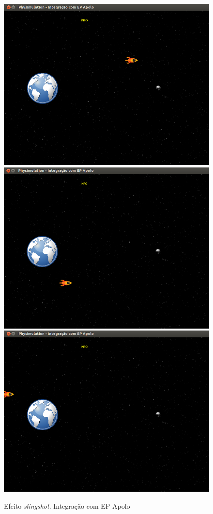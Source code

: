 \begin{figure}[H]
	\includegraphics[scale=0.22]{images/apolo-2.png}
	\includegraphics[scale=0.22]{images/apolo-1.png}
	\includegraphics[scale=0.22]{images/apolo-5.png}
	\caption{Efeito \textit{slingshot}. Integração com EP Apolo}
\end{figure}


